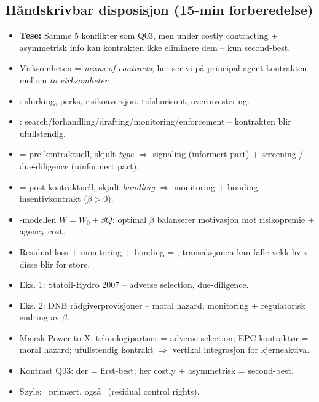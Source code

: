 \subsection*{Håndskrivbar disposisjon (15-min forberedelse)}
\begin{itemize}\setlength{\itemsep}{2pt}
\item \textbf{Tese:} Samme 5 konflikter som Q03, men under costly contracting + asymmetrisk info kan kontrakten ikke eliminere dem -- kun second-best.
\item Virksomheten = \emph{nexus of contracts}; her ser vi på principal-agent-kontrakten mellom \emph{to virksomheter}.
\item {}: shirking, perks, risikoaversjon, tidshorisont, overinvestering.
\item {}: search/forhandling/drafting/monitoring/enforcement -- kontrakten blir ufullstendig.
\item {} = pre-kontraktuell, skjult \emph{type} $\Rightarrow$ signaling (informert part) + screening / due-diligence (uinformert part).
\item {} = post-kontraktuell, skjult \emph{handling} $\Rightarrow$ monitoring + bonding + insentivkontrakt ($\beta > 0$).
\item {}-modellen $W = W_0 + \beta Q$: optimal $\beta$ balanserer motivasjon mot risikopremie + agency cost.
\item Residual loss $+$ monitoring $+$ bonding = ; transaksjonen kan falle vekk hvis disse blir for store.
\item Eks. 1: Statoil-Hydro 2007 -- adverse selection, due-diligence.
\item Eks. 2: DNB rådgiverprovisjoner -- moral hazard, monitoring + regulatorisk endring av $\beta$.
\item Mærsk Power-to-X: teknologipartner = adverse selection; EPC-kontraktør = moral hazard; ufullstendig kontrakt $\Rightarrow$ vertikal integrasjon for kjerneaktiva.
\item Kontrast Q03: der  = first-best; her costly + asymmetrisk = second-best.
\item Søyle: \SThree\ primært, også \SOne\ (residual control rights).
\end{itemize}
